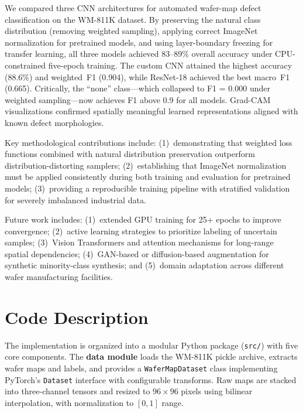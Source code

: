 \documentclass[conference]{IEEEtran}
\begin{document}
We compared three CNN architectures for automated wafer-map defect
classification on the WM-811K dataset. By preserving the natural class
distribution (removing weighted sampling), applying correct ImageNet
normalization for pretrained models, and using layer-boundary freezing for
transfer learning, all three models achieved 83--89\% overall accuracy under
CPU-constrained five-epoch training. The custom CNN attained the highest
accuracy (88.6\%) and weighted~F1 (0.904), while ResNet-18 achieved the best
macro~F1 (0.665). Critically, the ``none'' class---which collapsed to
F1 = 0.000 under weighted sampling---now achieves F1 above 0.9 for all
models. Grad-CAM visualizations confirmed spatially meaningful learned
representations aligned with known defect morphologies.

Key methodological contributions include: (1)~demonstrating that weighted loss
functions combined with natural distribution preservation outperform
distribution-distorting samplers; (2)~establishing that ImageNet normalization
must be applied consistently during both training and evaluation for
pretrained models; (3)~providing a reproducible training pipeline with
stratified validation for severely imbalanced industrial data.

Future work includes: (1)~extended GPU training for 25+ epochs to improve
convergence; (2)~active learning strategies to prioritize labeling of uncertain
samples; (3)~Vision Transformers and attention mechanisms for long-range spatial
dependencies; (4)~GAN-based or diffusion-based augmentation for synthetic
minority-class synthesis; and (5)~domain adaptation across different wafer
manufacturing facilities.

\section{Code Description}
\label{sec:code}

The implementation is organized into a modular Python package (\texttt{src/})
with five core components. The \textbf{data module} loads the WM-811K pickle
archive, extracts wafer maps and labels, and provides a \texttt{WaferMapDataset}
class implementing PyTorch's \texttt{Dataset} interface with configurable
transforms. Raw maps are stacked into three-channel tensors and resized to
$96 \times 96$ pixels using bilinear interpolation, with normalization to
$[0, 1]$ range.
\end{document}
